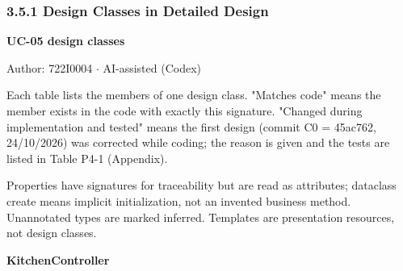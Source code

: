 \subsubsection*{3.5.1 Design Classes in Detailed Design}
\textbf{UC-05 design classes}

Author: 722I0004 \ensuremath{\cdot} AI-assisted (Codex)

Each table lists the members of one design class. "Matches code" means the member exists in the code with exactly this signature. "Changed during implementation and tested" means the first design (commit C0 = 45ac762, 24/10/2026) was corrected while coding; the reason is given and the tests are listed in Table P4-1 (Appendix).

Properties have signatures for traceability but are read as attributes; dataclass \guillemotleft{}create\guillemotright{} means implicit initialization, not an invented business method. Unannotated types are marked inferred. Templates are presentation resources, not design classes.

\textbf{KitchenController}

